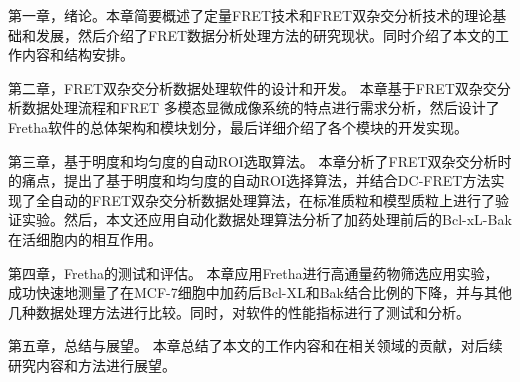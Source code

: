 \ifshowtext
第一章，绪论。本章简要概述了定量FRET技术和FRET双杂交分析技术的理论基础和发展，然后介绍了FRET数据分析处理方法的研究现状。同时介绍了本文的工作内容和结构安排。

第二章，FRET双杂交分析数据处理软件的设计和开发。
本章基于FRET双杂交分析数据处理流程和FRET 多模态显微成像系统的特点进行需求分析，然后设计了Fretha软件的总体架构和模块划分，最后详细介绍了各个模块的开发实现。

第三章，基于明度和均匀度的自动ROI选取算法。
本章分析了FRET双杂交分析时的痛点，提出了基于明度和均匀度的自动ROI选择算法，并结合DC-FRET方法实现了全自动的FRET双杂交分析数据处理算法，在标准质粒和模型质粒上进行了验证实验。然后，本文还应用自动化数据处理算法分析了加药处理前后的Bcl-xL-Bak在活细胞内的相互作用。

第四章，Fretha的测试和评估。
本章应用Fretha进行高通量药物筛选应用实验，成功快速地测量了在MCF-7细胞中加药后Bcl-XL和Bak结合比例的下降，并与其他几种数据处理方法进行比较。同时，对软件的性能指标进行了测试和分析。

第五章，总结与展望。
本章总结了本文的工作内容和在相关领域的贡献，对后续研究内容和方法进行展望。 
\fi

